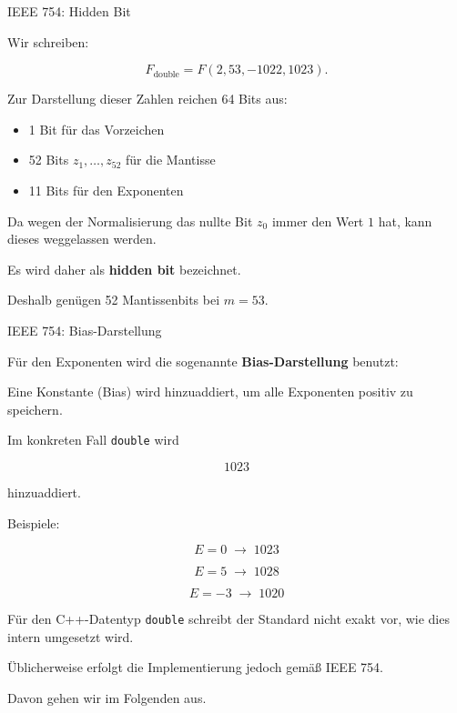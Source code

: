 \documentclass{beamer}
\begin{document}
\begin{frame}{IEEE 754: Hidden Bit}

\small

Wir schreiben:

\[
F_{\text{double}}=F(2,53,-1022,1023).
\]

\vspace{0.4cm}

Zur Darstellung dieser Zahlen reichen 64 Bits aus:

\begin{itemize}
\item 1 Bit für das Vorzeichen
\item 52 Bits \(z_1,\dots,z_{52}\) für die Mantisse
\item 11 Bits für den Exponenten
\end{itemize}

\vspace{0.6cm}

Da wegen der Normalisierung das nullte Bit \(z_0\) immer den Wert \(1\) hat,
kann dieses weggelassen werden.

\vspace{0.3cm}

Es wird daher als \textbf{hidden bit} bezeichnet.

\vspace{0.4cm}

Deshalb genügen 52 Mantissenbits bei \(m=53\).

\end{frame}

\begin{frame}{IEEE 754: Bias-Darstellung}

\small

Für den Exponenten wird die sogenannte \textbf{Bias-Darstellung} benutzt:

Eine Konstante (Bias) wird hinzuaddiert, um alle Exponenten positiv zu speichern.

\vspace{0.6cm}

Im konkreten Fall \texttt{double} wird

\[
1023
\]

hinzuaddiert.

\vspace{0.5cm}

Beispiele:

\[
E=0 \;\rightarrow\; 1023
\]

\[
E=5 \;\rightarrow\; 1028
\]

\[
E=-3 \;\rightarrow\; 1020
\]

\vspace{0.6cm}

Für den C++-Datentyp \texttt{double} schreibt der Standard nicht exakt vor,
wie dies intern umgesetzt wird.

Üblicherweise erfolgt die Implementierung jedoch gemäß IEEE 754.

Davon gehen wir im Folgenden aus.

\end{frame}
\end{document}
